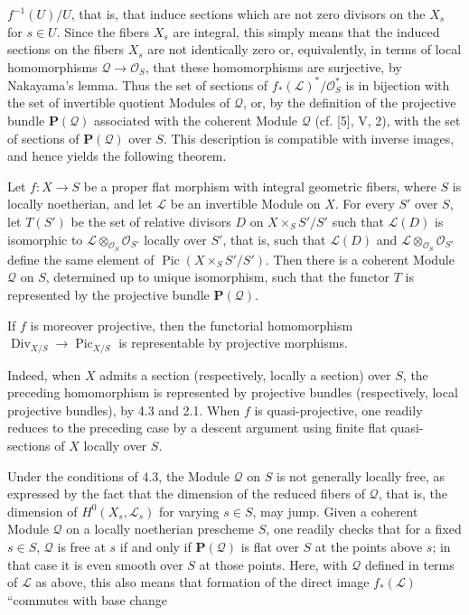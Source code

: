 $f^{-1}(U)/U$, that is, that induce sections which are not zero divisors on the
$X_s$ for $s\in U$. Since the fibers $X_s$ are integral, this simply means that
the induced sections on the fibers $X_s$ are not identically zero or,
equivalently, in terms of local homomorphisms
$\mathcal Q\longrightarrow\mathcal O_S$, that these homomorphisms are
surjective, by Nakayama's lemma. Thus the set of sections of
$f_*(\mathcal L)^*/\mathcal O_S^*$ is in bijection with the set of invertible
quotient Modules of $\mathcal Q$, or, by the definition of the projective
bundle $\mathbf P(\mathcal Q)$ associated with the coherent Module
$\mathcal Q$ (cf. [5], V, 2), with the set of sections of
$\mathbf P(\mathcal Q)$ over $S$. This description is compatible with inverse
images, and hence yields the following theorem.

 Let $f:X\longrightarrow S$ be a proper flat morphism with
integral geometric fibers, where $S$ is locally noetherian, and let
$\mathcal L$ be an invertible Module on $X$. For every $S'$ over $S$, let
$T(S')$ be the set of relative divisors $D$ on $X\times_SS'/S'$ such that
$\mathcal L(D)$ is isomorphic to
$\mathcal L\otimes_{\mathcal O_S}\mathcal O_{S'}$ locally over $S'$, that is,
such that $\mathcal L(D)$ and
$\mathcal L\otimes_{\mathcal O_S}\mathcal O_{S'}$ define the same element of
$\operatorname{Pic}(X\times_SS'/S')$. Then there is a coherent Module
$\mathcal Q$ on $S$, determined up to unique isomorphism, such that the functor
$T$ is represented by the projective bundle $\mathbf P(\mathcal Q)$.

 If $f$ is moreover projective, then the functorial
homomorphism
$\operatorname{Div}_{X/S}\longrightarrow\operatorname{Pic}_{X/S}$ is
representable by projective morphisms.

Indeed, when $X$ admits a section (respectively, locally a section) over $S$,
the preceding homomorphism is represented by projective bundles (respectively,
local projective bundles), by 4.3 and 2.1. When $f$ is quasi-projective, one
readily reduces to the preceding case by a descent argument using finite flat
quasi-sections of $X$ locally over $S$.

 Under the conditions of 4.3, the Module $\mathcal Q$ on
$S$ is not generally locally free, as expressed by the fact that the dimension
of the reduced fibers of $\mathcal Q$, that is, the dimension of
$H^0(X_s,\mathcal L_s)$ for varying $s\in S$, may jump. Given a coherent
Module $\mathcal Q$ on a locally noetherian prescheme $S$, one readily checks
that for a fixed $s\in S$, $\mathcal Q$ is free at $s$ if and only if
$\mathbf P(\mathcal Q)$ is flat over $S$ at the points above $s$; in that case
it is even smooth over $S$ at those points. Here, with $\mathcal Q$ defined in
terms of $\mathcal L$ as above, this also means that formation of the direct
image $f_*(\mathcal L)$ “commutes with base change

